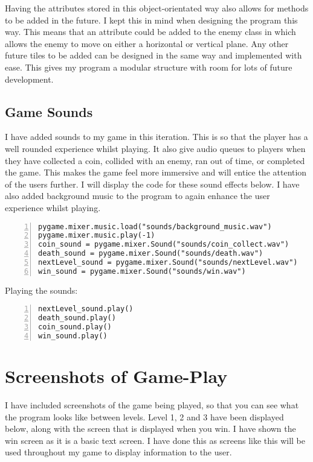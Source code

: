 \documentclass[12pt]{report}
\begin{document}
Having the attributes stored in this object-orientated way also allows for methods to be added in the future. I kept this in mind when designing the program this way. This means that an attribute could be added to the enemy class in which allows the enemy to move on either a horizontal or vertical plane. Any other future tiles to be added can be designed in the same way and implemented with ease. This gives my program a modular structure with room for lots of future development. 

\subsection{Game Sounds}
I have added sounds to my game in this iteration. This is so that the player has a well rounded experience whilst playing. It also give audio queues to players when they have collected a coin, collided with an enemy, ran out of time, or completed the game. This makes the game feel more immersive and will entice the attention of the users further. I will display the code for these sound effects below. I have also added background music to the program to again enhance the user experience whilst playing. 

\begin{Verbatim}[numbers=left, frame=single]
pygame.mixer.music.load("sounds/background_music.wav")
pygame.mixer.music.play(-1)
coin_sound = pygame.mixer.Sound("sounds/coin_collect.wav")
death_sound = pygame.mixer.Sound("sounds/death.wav")
nextLevel_sound = pygame.mixer.Sound("sounds/nextLevel.wav")
win_sound = pygame.mixer.Sound("sounds/win.wav")
\end{Verbatim}

Playing the sounds:

\begin{Verbatim}[numbers=left, frame=single]
nextLevel_sound.play()
death_sound.play()
coin_sound.play()
win_sound.play()
\end{Verbatim}

\pagebreak
 
\section{Screenshots of Game-Play}
 I have included screenshots of the game being played, so that you can see what the program looks like between levels. Level 1, 2 and 3 have been displayed below, along with the screen that is displayed when you win. I have shown the win screen as it is a basic text screen. I have done this as screens like this will be used throughout my game to display information to the user.
 
\end{document}
